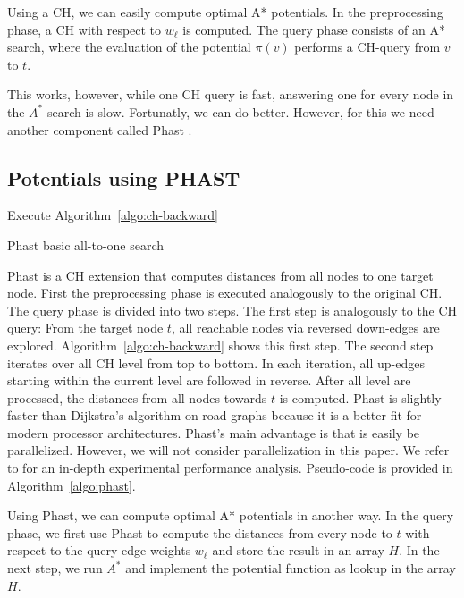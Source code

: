 \documentclass[sigconf]{acmart}
\begin{document}
Using a CH, we can easily compute optimal A* potentials.
In the preprocessing phase, a CH with respect to $w_\ell$ is computed.
The query phase consists of an A* search, where the evaluation of the potential $\pi(v)$ performs a CH-query from $v$ to $t$.

This works, however, while one CH query is fast, answering one for every node in the $A^*$ search is slow.
Fortunatly, we can do better.
However, for this we need another component called Phast \cite{dgnw-phast-13}.

\subsection{Potentials using PHAST}

\begin{algorithm2e}
Execute Algorithm~\ref{algo:ch-backward}\;
\caption{Phast basic all-to-one search}
\label{algo:phast}
\end{algorithm2e}

Phast \cite{dgnw-phast-13} is a CH extension that computes distances from all nodes to one target node.
First the preprocessing phase is executed analogously to the original CH.
The query phase is divided into two steps.
The first step is analogously to the CH query:
From the target node $t$, all reachable nodes via reversed down-edges are explored.
Algorithm~\ref{algo:ch-backward} shows this first step.
The second step iterates over all CH level from top to bottom.
In each iteration, all up-edges starting within the current level are followed in reverse.
After all level are processed, the distances from all nodes towards $t$ is computed.
Phast is slightly faster than Dijkstra's algorithm on road graphs because it is a better fit for modern processor architectures.
Phast's main advantage is that is easily be parallelized.
However, we will not consider parallelization in this paper.
We refer to \cite{dgnw-phast-13} for an in-depth experimental performance analysis.
Pseudo-code is provided in Algorithm~\ref{algo:phast}.

Using Phast, we can compute optimal A* potentials in another way.
In the query phase, we first use Phast to compute the distances from every node to $t$ with respect to the query edge weights $w_\ell$ and store the result in an array $H$.
In the next step, we run $A^*$ and implement the potential function as lookup in the array $H$.
\end{document}
